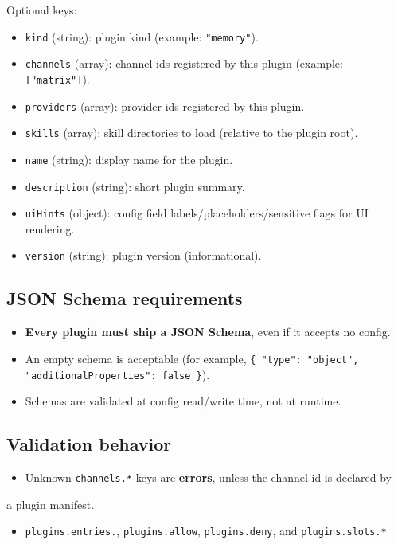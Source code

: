 Optional keys:

\begin{itemize}
  \item \texttt{kind} (string): plugin kind (example: \texttt{"memory"}).
  \item \texttt{channels} (array): channel ids registered by this plugin (example: \texttt{["matrix"]}).
  \item \texttt{providers} (array): provider ids registered by this plugin.
  \item \texttt{skills} (array): skill directories to load (relative to the plugin root).
  \item \texttt{name} (string): display name for the plugin.
  \item \texttt{description} (string): short plugin summary.
  \item \texttt{uiHints} (object): config field labels/placeholders/sensitive flags for UI rendering.
  \item \texttt{version} (string): plugin version (informational).
\end{itemize}


\subsection{JSON Schema requirements}


\begin{itemize}
  \item \textbf{Every plugin must ship a JSON Schema}, even if it accepts no config.
  \item An empty schema is acceptable (for example, \texttt{\{ "type": "object", "additionalProperties": false \}}).
  \item Schemas are validated at config read/write time, not at runtime.
\end{itemize}


\subsection{Validation behavior}


\begin{itemize}
  \item Unknown \texttt{channels.*} keys are \textbf{errors}, unless the channel id is declared by
\end{itemize}

a plugin manifest.
\begin{itemize}
  \item \texttt{plugins.entries.}, \texttt{plugins.allow}, \texttt{plugins.deny}, and \texttt{plugins.slots.*}
\end{itemize}

